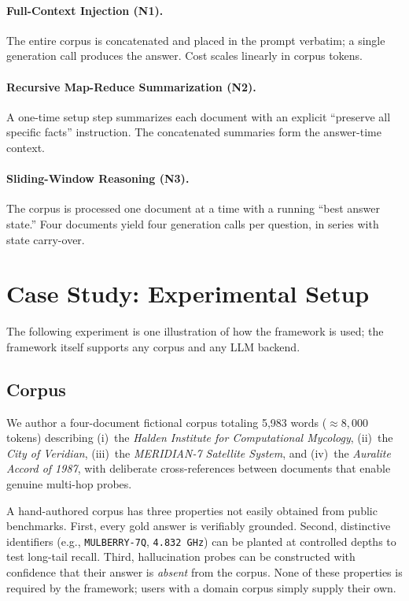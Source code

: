 \documentclass[conference,a4paper,10pt]{IEEEtran}
\begin{document}
\paragraph{Full-Context Injection (N1).}
The entire corpus is concatenated and placed in the prompt verbatim; a single generation call produces the answer.
Cost scales linearly in corpus tokens.

\paragraph{Recursive Map-Reduce Summarization (N2).}
A one-time setup step summarizes each document with an explicit ``preserve all specific facts'' instruction.
The concatenated summaries form the answer-time context.

\paragraph{Sliding-Window Reasoning (N3).}
The corpus is processed one document at a time with a running ``best answer state.''
Four documents yield four generation calls per question, in series with state carry-over.

\section{Case Study: Experimental Setup}
\label{sec:setup}

The following experiment is one illustration of how the framework is used; the framework itself supports any corpus and any LLM backend.

\subsection{Corpus}
\label{sec:corpus}

We author a four-document fictional corpus totaling 5{,}983 words ($\approx 8{,}000$ tokens) describing (i)~the \emph{Halden Institute for Computational Mycology}, (ii)~the \emph{City of Veridian}, (iii)~the \emph{MERIDIAN-7 Satellite System}, and (iv)~the \emph{Auralite Accord of 1987}, with deliberate cross-references between documents that enable genuine multi-hop probes.

A hand-authored corpus has three properties not easily obtained from public benchmarks.
First, every gold answer is verifiably grounded.
Second, distinctive identifiers (e.g., \texttt{MULBERRY-7Q}, \texttt{4.832~GHz}) can be planted at controlled depths to test long-tail recall.
Third, hallucination probes can be constructed with confidence that their answer is \emph{absent} from the corpus.
None of these properties is required by the framework; users with a domain corpus simply supply their own.
\end{document}
